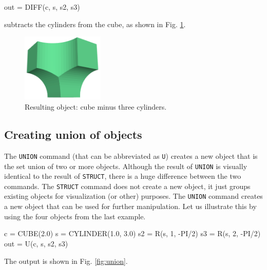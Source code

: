 \begin{bluecode}
out = DIFF(c, s, s2, s3) 
\end{bluecode}
subtracts the cylinders from the cube, as shown in Fig. \ref{fig:diff-4}.

\begin{figure}[!ht]
\begin{center}
\includegraphics[width=0.35\textwidth]{img/diff-4b.png}
\end{center}
\vspace{-4mm}
\caption{Resulting object: cube minus three cylinders.}
\label{fig:diff-4}
\end{figure}

\subsection{Creating union of objects}\label{subsec:union}

The {\tt UNION} command (that can be abbreviated as {\tt U})
creates a new object that is the set union 
of two or more objects. Although the result of {\tt UNION}
is visually identical to the result of {\tt STRUCT}, 
there is a huge difference between the two commands.
The {\tt STRUCT} command does not create a new object, it just 
groups existing objects for visualization (or other)  purposes. 
The {\tt UNION} command creates a new 
object that can be used for further manipulation. Let us 
illustrate this by using the four objects from the last 
example. 

\begin{bluecode}
c = CUBE(2.0)
s = CYLINDER(1.0, 3.0)
s2 = R(s, 1, -PI/2)
s3 = R(s, 2, -PI/2)
out = U(c, s, s2, s3) 
\end{bluecode}
The output is shown in Fig. \ref{fig:union}.\\


